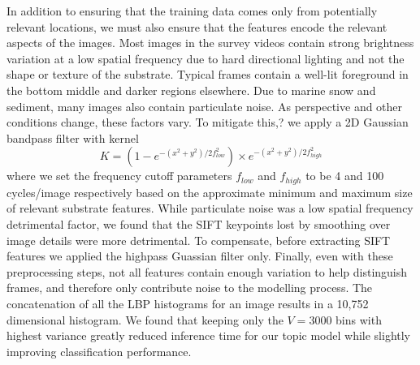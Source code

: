 In addition to ensuring that the training data comes only from potentially relevant locations, we must also ensure that the features encode the relevant aspects of the images.
Most images in the survey videos contain strong brightness variation at a low spatial frequency due to hard directional lighting and not the shape or texture of the substrate. Typical frames contain a well-lit foreground in the bottom middle and darker regions elsewhere. Due to marine snow and sediment, many images also contain particulate noise.
As perspective and other conditions change, these factors vary. To mitigate this,? we apply a 2D Gaussian bandpass filter with kernel
\begin{equation}
K = (1-e^{-(x^2+y^2)/2f_{low}^2}) \times e^{-(x^2+y^2)/2f_{high}^2}
\end{equation} 
where we set the frequency cutoff parameters $f_{low}$ and $f_{high}$ to be 4 and 100 cycles/image respectively based on the approximate minimum and maximum size of relevant substrate features. While particulate noise was a low spatial frequency detrimental factor, we found that the SIFT keypoints lost by smoothing over image details were more detrimental. To compensate, before extracting SIFT features we applied the highpass Guassian filter only. Finally, even with these preprocessing steps, not all features contain enough variation to help distinguish frames, and therefore only contribute noise to the modelling process. The concatenation of all the LBP histograms for an image results in a 10,752 dimensional histogram. We found that keeping only the $V = 3000$ bins with highest variance greatly reduced inference time for our topic model while slightly improving classification performance.

